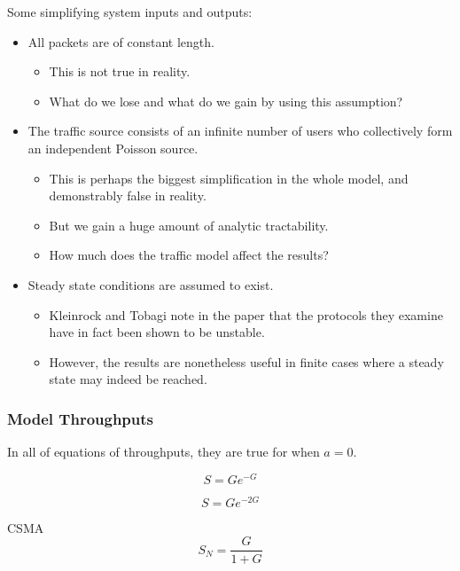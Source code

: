 Some simplifying system inputs and outputs:
\begin{itemize}[noitemsep]
\item All packets are of constant length.
  \begin{itemize}[noitemsep]
  \item This is not true in reality.
  \item What do we lose and what do we gain by using this assumption?
  \end{itemize}
\item The traffic source consists of an infinite number of users who collectively form an independent Poisson source.
  \begin{itemize}[noitemsep]
  \item This is perhaps the biggest simplification in the whole model, and demonstrably false in reality.
  \item But we gain a huge amount of analytic tractability.
  \item How much does the traffic model affect the results?
  \end{itemize}
\item Steady state conditions are assumed to exist.
  \begin{itemize}[noitemsep]
  \item Kleinrock and Tobagi note in the paper that the protocols they examine have in fact been shown to be unstable.
  \item However, the results are nonetheless useful in finite cases where a steady state may indeed be reached.
  \end{itemize}
\end{itemize}

\subsubsection{Model Throughputs}\label{subsubsec:Kleinrock_Tobagi_Model_Throughputs}
In all of equations of throughputs, they are true for when $a = 0$.

\begin{equation}\label{eq:ALOHA_Throughput}
  S = Ge^{-G}
\end{equation}

\begin{equation}\label{eq:Slotted_ALOHA_Throughput}
  S = G e^{-2G}
\end{equation}

 CSMA
\begin{equation}\label{eq:Non_Persistent_CSMA_Throughput}
  S_{N} = \frac{G}{1+G}
\end{equation}

